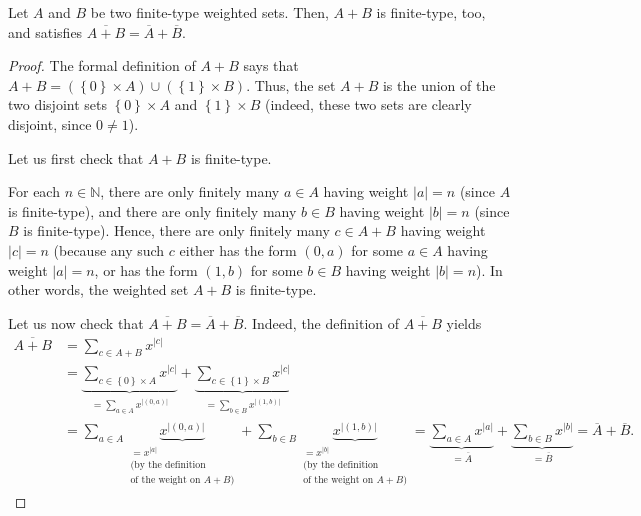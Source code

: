 \begin{proposition}
\label{prop.gf-ws.djun}
\leantarget
\leanok
Let $A$ and $B$ be two finite-type weighted sets. Then,
$A+B$ is finite-type, too, and satisfies $\overline{A+B}=\overline
{A}+\overline{B}$.
\end{proposition}

\begin{proof}
\leanok
The formal definition of $A+B$ says that $A+B=\left(  \left\{  0\right\}
\times A\right)  \cup\left(  \left\{  1\right\}  \times B\right)  $. Thus, the
set $A+B$ is the union of the two disjoint sets $\left\{  0\right\}  \times A$
and $\left\{  1\right\}  \times B$ (indeed, these two sets are clearly
disjoint, since $0\neq1$).

Let us first check that $A+B$ is finite-type.

For each $n\in\mathbb{N}$, there are only finitely many $a\in A$ having weight
$\left\vert a\right\vert =n$ (since $A$ is finite-type), and there are only
finitely many $b\in B$ having weight $\left\vert b\right\vert =n$ (since $B$
is finite-type). Hence, there are only finitely many $c\in A+B$ having weight
$\left\vert c\right\vert =n$ (because any such $c$ either has the form
$\left(  0,a\right)  $ for some $a\in A$ having weight $\left\vert
a\right\vert =n$, or has the form $\left(  1,b\right)  $ for some $b\in B$
having weight $\left\vert b\right\vert =n$). In other words, the weighted set
$A+B$ is finite-type.

Let us now check that $\overline{A+B}=\overline{A}+\overline{B}$. Indeed, the
definition of $\overline{A+B}$ yields%
\begin{align*}
\overline{A+B}  &  =\sum_{c\in A+B}x^{\left\vert c\right\vert }\\
&  =\underbrace{\sum_{c\in\left\{  0\right\}  \times A}x^{\left\vert
c\right\vert }}_{\substack{=\sum_{a\in A}x^{\left\vert \left(  0,a\right)
\right\vert }}}+\underbrace{\sum_{c\in\left\{  1\right\}  \times B}x^{\left\vert
c\right\vert }}_{\substack{=\sum_{b\in B}x^{\left\vert \left(  1,b\right)
\right\vert }}}\\
&  =\sum_{a\in A}\underbrace{x^{\left\vert \left(  0,a\right)  \right\vert }%
}_{\substack{=x^{\left\vert a\right\vert }\\\text{(by the definition}\\
\text{of the weight on }A+B\text{)}}}+\sum_{b\in B}\underbrace{x^{\left\vert
\left(  1,b\right)  \right\vert }}_{\substack{=x^{\left\vert b\right\vert
}\\\text{(by the definition}\\
\text{of the weight on }A+B\text{)}}}=\underbrace{\sum_{a\in
A}x^{\left\vert a\right\vert }}_{=\overline{A}}+\underbrace{\sum_{b\in
B}x^{\left\vert b\right\vert }}_{=\overline{B}}=\overline{A}+\overline{B}.
\end{align*}
\end{proof}

